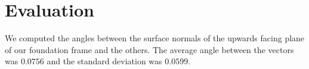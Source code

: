 \section{Evaluation}
We computed the angles between the surface normals of the upwards facing plane of our foundation frame and the others. The average angle between the vectors was $0.0756$ and the standard deviation was $0.0599$.